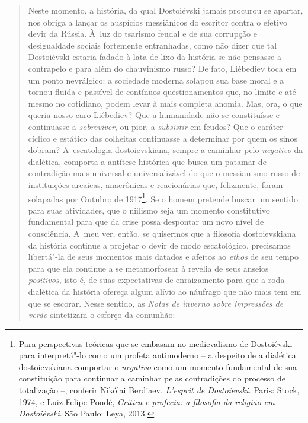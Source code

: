 {\begin{quote}
Neste momento, a história, da qual Dostoiévski jamais procurou se
apartar, nos obriga a lançar os auspícios messiânicos do escritor contra
o efetivo devir da Rússia. À~luz do tsarismo feudal e de sua corrupção e
desigualdade sociais fortemente entranhadas, como não dizer que tal
Dostoiévski estaria fadado à lata de lixo da história se não pensasse a
contrapelo e para além do chauvinismo russo? De fato, Liébediev toca em
um ponto nevrálgico: a sociedade moderna solapou sua base moral e a
tornou fluida e passível de contínuos questionamentos que, no limite e
até mesmo no cotidiano, podem levar à mais completa anomia. Mas, ora, o
que queria nosso caro Liébediev? Que a humanidade não se constituísse e
continuasse a \emph{sobreviver}, ou pior, a \emph{subsistir} em feudos?
Que o caráter cíclico e estático das colheitas continuasse a determinar
por quem os sinos dobram? A~escatologia dostoievskiana, sempre a
caminhar pelo \emph{negativo} da dialética, comporta a antítese
histórica que busca um patamar de contradição mais universal e
universalizável do que o messianismo russo de instituições arcaicas,
anacrônicas e reacionárias que, felizmente, foram solapadas por Outubro
de 1917\footnote{Para perspectivas teóricas que se embasam no
  medievalismo de Dostoiévski para interpretá"-lo como um profeta
  antimoderno -- a despeito de a dialética dostoievskiana comportar o
  \emph{negativo} como um momento fundamental de sua constituição para
  continuar a caminhar pelas contradições do processo de totalização --,
  conferir Nikólai Berdiaev, \emph{L'esprit de Dostoïevski.} Paris:
  Stock, 1974, e Luiz Felipe Pondé, \emph{Crítica e profecia: a
  filosofia da religião em Dostoiévski}. São Paulo: Leya, 2013.}. Se o
homem pretende buscar um sentido para suas atividades, que o niilismo
seja um momento constitutivo fundamental para que da crise possa
despontar um novo nível de consciência. A~meu ver, então, se quisermos
que a filosofia dostoievskiana da história continue a projetar o devir
de modo escatológico, precisamos libertá"-la de seus momentos mais
datados e afeitos ao \emph{ethos} de seu tempo para que ela continue a
se metamorfosear à revelia de seus anseios \emph{positivos}, isto é, de
suas expectativas de enraizamento para que a roda dialética da história
ofereça algum alívio ao náufrago que não mais tem em que se escorar.
Nesse sentido, as \emph{Notas de inverno sobre impressões de verão}
sintetizam o esforço da comunhão:


\end{quote}}
